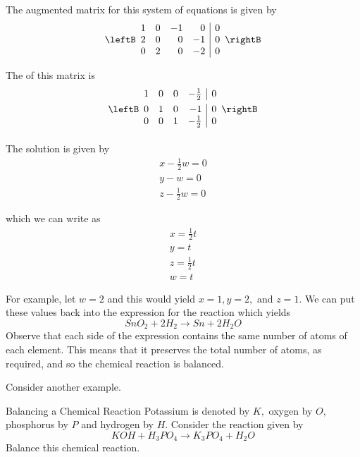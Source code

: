 The augmented matrix for this system of equations is given by 
\begin{equation*}
\leftB 
\begin{array}{rrrr|r}
1 & 0 & -1 & 0 & 0 \\ 
2 & 0 & 0 & -1 & 0 \\ 
0 & 2 & 0 & -2 & 0
\end{array}
\rightB
\end{equation*}

The \rref \;of this matrix is 
\begin{equation*}
\leftB
\begin{array}{rrrr|r}
1 & 0 & 0 & -\vspace{0.05in}\frac{1}{2} & 0 \\ 
0 & 1 & 0 & -1 & 0 \\ 
0 & 0 & 1 & -\vspace{0.05in}\frac{1}{2} & 0
\end{array}
\rightB
\end{equation*}

The solution is given by 
\begin{equation*}
\begin{array}{c}
x - \frac{1}{2} w = 0 \\
y - w = 0 \\
z - \frac{1}{2}w = 0
\end{array}
\end{equation*} 

which we can write as 
\begin{equation*}
\begin{array}{c}
x = \frac{1}{2} t \\
y = t \\
z = \frac{1}{2}t \\
w = t
\end{array}
\end{equation*}

For example, let $w=2$ and this would yield $x=1,y=2,$ and $z=1.$ We can put these values back into 
the expression for the reaction which yields 
\begin{equation*}
SnO_{2}+2H_{2}\rightarrow Sn+2H_{2}O
\end{equation*}
Observe that each side of the expression contains the same number of atoms of each element. This means that 
it preserves the total number of atoms, as required, and so the chemical
reaction is balanced. 

Consider another example.

\begin{example}{Balancing a Chemical Reaction}\label{exa:balancingchem}
Potassium is denoted by $K,$ oxygen by $O,$
phosphorus by $P$ and hydrogen by $H$. 
Consider the reaction given by
\begin{equation*}
KOH+H_{3}PO_{4}\rightarrow K_{3}PO_{4}+H_{2}O
\end{equation*}
Balance this chemical reaction.
\end{example}

